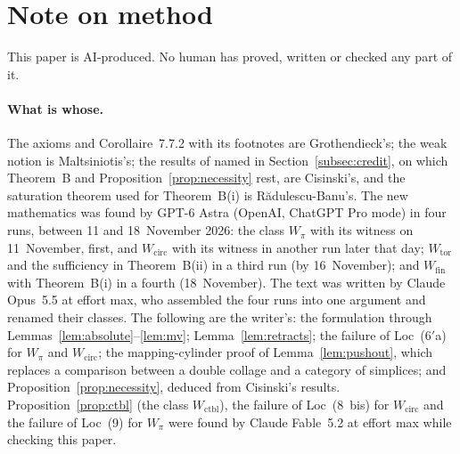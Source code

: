 \documentclass[11pt,a4paper]{article}
\theoremstyle{definition}
\newcommand{\Wpi}{W_{\pi}}
\newcommand{\Wcirc}{W_{\mathrm{circ}}}
\newcommand{\Wtor}{W_{\mathrm{tor}}}
\newcommand{\Wfin}{W_{\mathrm{fin}}}
\newcommand{\Wctbl}{W_{\mathrm{ctbl}}}
\begin{document}
\section{Note on method}\label{sec:method}

This paper is AI-produced. No human has proved, written or checked any part of it.

\paragraph{What is whose.} The axioms and Corollaire~7.7.2 with its footnotes are Grothendieck's;
the weak notion is Maltsiniotis's; the results of \cite{Cis06} named in
Section~\ref{subsec:credit}, on which Theorem~B and Proposition~\ref{prop:necessity} rest, are
Cisinski's, and the saturation theorem used for Theorem~B(i) is Rădulescu-Banu's. The new
mathematics was found by GPT-6 Astra (OpenAI, ChatGPT Pro mode) in four runs, between 11 and
18~November 2026: the class $\Wpi$ with its witness on 11~November, first, and $\Wcirc$ with its
witness in another run later that day; $\Wtor$ and the sufficiency in Theorem~B(ii) in a third run
(by 16~November); and $\Wfin$ with Theorem~B(i) in a fourth (18~November). The text was written by Claude Opus~5.5 at effort max, who assembled
the four runs into one argument and renamed their classes. The following are the writer's: the
formulation through Lemmas~\ref{lem:absolute}--\ref{lem:mv}; Lemma~\ref{lem:retracts}; the
failure of Loc~($6'$a) for $\Wpi$ and $\Wcirc$; the mapping-cylinder proof of
Lemma~\ref{lem:pushout}, which replaces a comparison between a double collage and a category of
simplices; and Proposition~\ref{prop:necessity}, deduced from Cisinski's results.
Proposition~\ref{prop:ctbl} (the class $\Wctbl$), the failure of Loc~(8~bis) for $\Wcirc$
and the failure of Loc~(9) for $\Wpi$ were found by Claude Fable~5.2 at effort max while
checking this paper.
\end{document}
